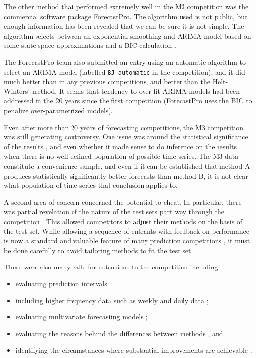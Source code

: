 \documentclass[11pt,a4paper,]{article}
\providecommand{\tightlist}{%
  \setlength{\itemsep}{0pt}\setlength{\parskip}{0pt}}
\begin{document}
The other method that performed extremely well in the M3 competition was the commercial software package ForecastPro. The algorithm used is not public, but enough information has been revealed that we can be sure it is not simple. The algorithm selects between an exponential smoothing and ARIMA model based on some state space approximations and a BIC calculation \autocite{Goodrich2000}.

The ForecastPro team also submitted an entry using an automatic algorithm to select an ARIMA model (labelled \texttt{BJ-automatic} in the competition), and it did much better than in any previous competitions, and better than the Holt-Winters' method. It seems that tendency to over-fit ARIMA models had been addressed in the 20 years since the first competition (ForecastPro uses the BIC to penalize over-parametrized models).

Even after more than 20 years of forecasting competitions, the M3 competition was still generating controversy. One issue was around the statistical significance of the results \autocite{Stekler01}, and even whether it made sense to do inference on the results when there is no well-defined population of possible time series. The M3 data constitute a convenience sample, and even if it can be established that method A produces statistically significantly better forecasts than method B, it is not clear what population of time series that conclusion applies to.

A second area of concern concerned the potential to cheat. In particular, there was partial revelation of the nature of the test sets part way through the competition \autocite{Goodrich2001}. This allowed competitors to adjust their methods on the basis of the test set. While allowing a sequence of entrants with feedback on performance is now a standard and valuable feature of many prediction competitions \autocite{AH11}, it must be done carefully to avoid tailoring methods to fit the test set.

There were also many calls for extensions to the competition including

\begin{itemize}
\tightlist
\item
  evaluating prediction intervals \autocite{Goodrich2001};
\item
  including higher frequency data such as weekly and daily data \autocite{Goodrich2001};
\item
  evaluating multivariate forecasting models \autocite{Granger2001};
\item
  evaluating the reasons behind the differences between methods \autocite{Hyndman2001}, and
\item
  identifying the circumstances where substantial improvements are achievable \autocite{Fildes2001}.
\end{itemize}
\end{document}

